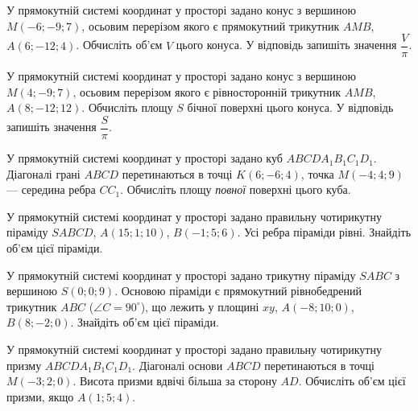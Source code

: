 \documentclass[12pt]{article}
\begin{document}
\begin{samepage}
\noindent\zadnum У прямокутній системі координат у просторі задано конус з вершиною $M(-6; -9; 7)$, осьовим перерізом якого є прямокутний трикутник $AMB$, $A(6; -12; 4)$. Обчисліть об'єм $V$ цього конуса. У відповідь запишіть значення $\dfrac{V}{\pi}$. 
\nmtAnswerBox
\par{}
\end{samepage}

\begin{samepage}
\noindent\zadnum У прямокутній системі координат у просторі задано конус з вершиною $M(4; -9; 7)$, осьовим перерізом якого є рівносторонній трикутник $AMB$, $A(8; -12; 12)$. Обчисліть площу $S$ бічної поверхні цього конуса. У відповідь запишіть значення $\dfrac{S}{\pi}$. 
\nmtAnswerBox
\par{}
\end{samepage}

\begin{samepage}
\noindent\zadnum У прямокутній системі координат у просторі задано куб $ABCDA_1B_1C_1D_1$. Діагоналі грані $ABCD$ перетинаються в точці $K(6; -6; 4)$, точка $M(-4; 4; 9)$ --- середина ребра $CC_1$. Обчисліть площу \textit{повної} поверхні цього куба. 
\nmtAnswerBox
\par{}
\end{samepage}

\begin{samepage}
\noindent\zadnum У прямокутній системі координат у просторі задано правильну чотирикутну піраміду $SABCD$, $A(15; 1; 10)$, $B(-1; 5; 6)$. Усі ребра піраміди рівні. Знайдіть об'єм цієї піраміди. 
\nmtAnswerBox
\par{}
\end{samepage}

\begin{samepage}
\noindent\zadnum У прямокутній системі координат у просторі задано трикутну піраміду $SABC$ з вершиною $S(0; 0; 9)$. Основою піраміди є прямокутний рівнобедрений трикутник $ABC$ ($\angle C = 90^\circ$), що лежить у площині $xy$, $A(-8; 10; 0)$, $B(8; -2; 0)$. Знайдіть об'єм цієї піраміди. 
\nmtAnswerBox
\par{}
\end{samepage}

\begin{samepage}
\noindent\zadnum У прямокутній системі координат у просторі задано правильну чотирикутну призму $ABCDA_1B_1C_1D_1$. Діагоналі основи $ABCD$ перетинаються в точці $M(-3; 2; 0)$. Висота призми вдвічі більша за сторону $AD$. Обчисліть об'єм цієї призми, якщо $A(1; 5; 4)$. 
\nmtAnswerBox
\par{}
\end{samepage}
\end{document}
